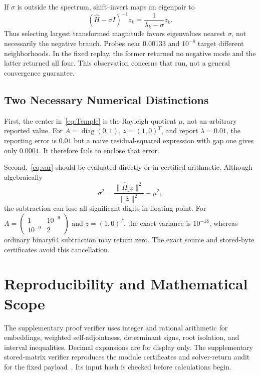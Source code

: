 \documentclass[journal,a4paper,10pt]{IEEEtran}
\theoremstyle{definition}\newtheorem{definition}[theorem]{Definition}
\theoremstyle{remark}\newtheorem{remark}[theorem]{Remark}
\newcommand{\diag}{\operatorname{diag}}
\newcommand{\norm}[1]{\lVert #1\rVert}
\begin{document}
If $\sigma$ is outside the spectrum, shift--invert maps an eigenpair to
\begin{equation}
(\widehat H-\sigma I)^{-1}z_k=
\frac1{\lambda_k-\sigma}z_k.
\end{equation}
Thus selecting largest transformed magnitude favors eigenvalues nearest $\sigma$, not necessarily the negative branch. Probes near $0.00133$ and $10^{-8}$ target different neighborhoods. In the fixed replay, the former returned no negative mode and the latter returned all four. This observation concerns that run, not a general convergence guarantee.

\subsection{Two Necessary Numerical Distinctions}
First, the center in~\eqref{eq:Temple} is the Rayleigh quotient $\mu$, not an arbitrary reported value. For $A=\diag(0,1)$, $z=(1,0)^T$, and report $\widetilde\lambda=0.01$, the reporting error is $0.01$ but a naive residual-squared expression with gap one gives only $0.0001$. It therefore fails to enclose that error.

Second,~\eqref{eq:var} should be evaluated directly or in certified arithmetic. Although algebraically
\begin{equation}
\sigma^2=\frac{\norm{\widehat H_jz}^2}{\norm z^2}-\mu^2,
\end{equation}
the subtraction can lose all significant digits in floating point. For $A=\left(\begin{smallmatrix}1&10^{-9}\\10^{-9}&2\end{smallmatrix}\right)$ and $z=(1,0)^T$, the exact variance is $10^{-18}$, whereas ordinary binary64 subtraction may return zero. The exact source and stored-byte certificates avoid this cancellation.

\balance
\section{Reproducibility and Mathematical Scope}
The supplementary proof verifier uses integer and rational arithmetic for embeddings, weighted self-adjointness, determinant signs, root isolation, and interval inequalities. Decimal expansions are for display only. The supplementary stored-matrix verifier reproduces the module certificates and solver-return audit for the fixed payload~\cite{supplement,audit}. Its input hash is checked before calculations begin.
\end{document}
